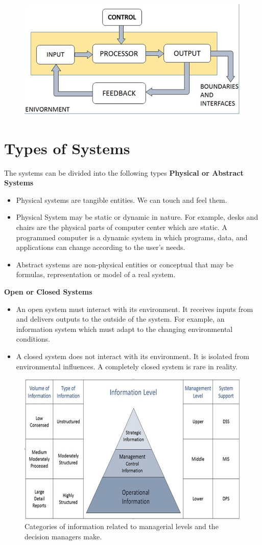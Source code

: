 \documentclass[a4paper,12pt]{report}
\begin{document}
\begin{figure}[h]
	\centering
	\includegraphics[width=0.7\linewidth]{2}
	\label{fig:2}
\end{figure}
\section{Types of Systems}
The systems can be divided into the following types 
\textbf{Physical or Abstract Systems}
\begin{itemize}
	\item	Physical systems are tangible entities. We can touch and feel them.
	\item	Physical System may be static or dynamic in nature. For example, desks and chairs are the physical parts of computer center which are static. A programmed computer is a dynamic system in which programs, data, and applications can change according to the user's needs.
	\item	Abstract systems are non-physical entities or conceptual that may be formulas, representation or model of a real system.
\end{itemize}
\textbf{Open or Closed Systems}
\begin{itemize}
	\item	An open system must interact with its environment. It receives inputs from and delivers outputs to the outside of the system. For example, an information system which must adapt to the changing environmental conditions.
	\item	A closed system does not interact with its environment. It is isolated from environmental influences. A completely closed system is rare in reality.
\end{itemize}
\begin{figure}[h]
	\centering
	\includegraphics[width=0.7\linewidth]{3}
	\caption{Categories of information related to managerial levels and the decision managers make.}
	\label{fig:3}
\end{figure}
\end{document}
